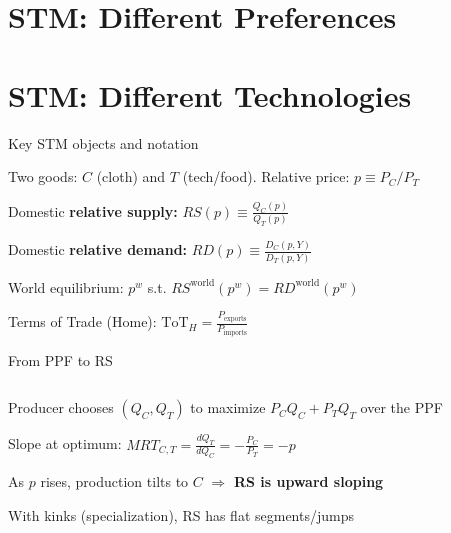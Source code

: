 \documentclass[notes,11pt, aspectratio=169, xcolor=table]{beamer}
\newenvironment{wideitemize}{\itemize\addtolength{\itemsep}{10pt}}{\enditemize}
\begin{document}
\section{STM: Different Preferences}

\section{STM: Different Technologies}


\begin{frame}{Key STM objects and notation}
\begin{wideitemize}
  \item Two goods: $C$ (cloth) and $T$ (tech/food). Relative price: $p \equiv P_C/P_T$
  \item Domestic \textbf{relative supply:} $RS(p) \equiv \frac{Q_C(p)}{Q_T(p)}$
  \item Domestic \textbf{relative demand:} $RD(p) \equiv \frac{D_C(p,Y)}{D_T(p,Y)}$
  \item World equilibrium: $p^{w}$ s.t. $RS^{\text{world}}(p^{w})=RD^{\text{world}}(p^{w})$
  \item Terms of Trade (Home): $\text{ToT}_H = \frac{P_{\text{exports}}}{P_{\text{imports}}}$
\end{wideitemize}
\end{frame}

\begin{frame}{From PPF to RS}
\begin{columns}[T]
\begin{column}{0.58\textwidth}
\begin{wideitemize}
  \item Producer chooses $(Q_C,Q_T)$ to maximize $P_C Q_C + P_T Q_T$ over the PPF
  \item Slope at optimum: $MRT_{C,T} = \frac{dQ_T}{dQ_C} = -\frac{P_C}{P_T}=-p$
  \item As $p$ rises, production tilts to $C$ $\Rightarrow$ \textbf{RS is upward sloping}
  \item With kinks (specialization), RS has flat segments/jumps
\end{wideitemize}
\end{column}
\begin{column}{0.38\textwidth}
\centering
\end{column}
\end{columns}
\end{frame}
\end{document}
